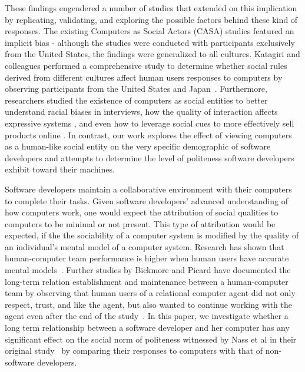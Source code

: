 \documentclass{sig-alternate-05-2015}
\begin{document}

These findings engendered a number of studies that extended on this implication by replicating, validating, and exploring the possible factors behind these kind of responses. The existing Computers as Social Actors (CASA) studies featured an implicit bias - although the studies were conducted with participants exclusively from the United States, the findings were generalized to all cultures. Katagiri and colleagues performed a comprehensive study to determine whether social rules derived from different cultures affect human users responses to computers by observing participants from the United States and Japan~\cite{katagiri2001cross}. Furthermore, researchers studied the existence of computers as social entities to better understand racial biases in interviews\cite{krysan2003race}, how the quality of interaction affects expressive systems \cite{vidyarthi2011sympathetic}, and even how to leverage social cues to more effectively sell products online \cite{wang2007can}. In contrast, our work explores the effect of viewing computers as a human-like social entity on the very specific demographic of software developers and attempts to determine the level of politeness software developers exhibit toward their machines.

Software developers maintain a collaborative environment with their computers to complete their tasks. Given software developers' advanced understanding of how computers work, one would expect the attribution of social qualities to computers to be minimal or not present.  This type of attribution would be expected, if the the sociability of a computer system is modified by the quality of an individual's mental model of a computer system. Research has shown that human-computer team performance is higher when human users have accurate mental models~\cite{wilkison2007effects}. Further studies by Bickmore and Picard have documented the long-term relation establishment and maintenance between a human-computer team by observing that human users of a relational computer agent did not only respect, trust, and like the agent, but also wanted to continue working with the agent even after the end of the study~\cite{Bickmore:2005:EML:1067860.1067867}. In this paper, we investigate whether a long term relationship between a software developer and her computer has any significant effect on the social norm of politeness witnessed by Nass et al in their original study~\cite{nass1999people} by comparing their responses to computers with that of non-software developers.
\end{document}
